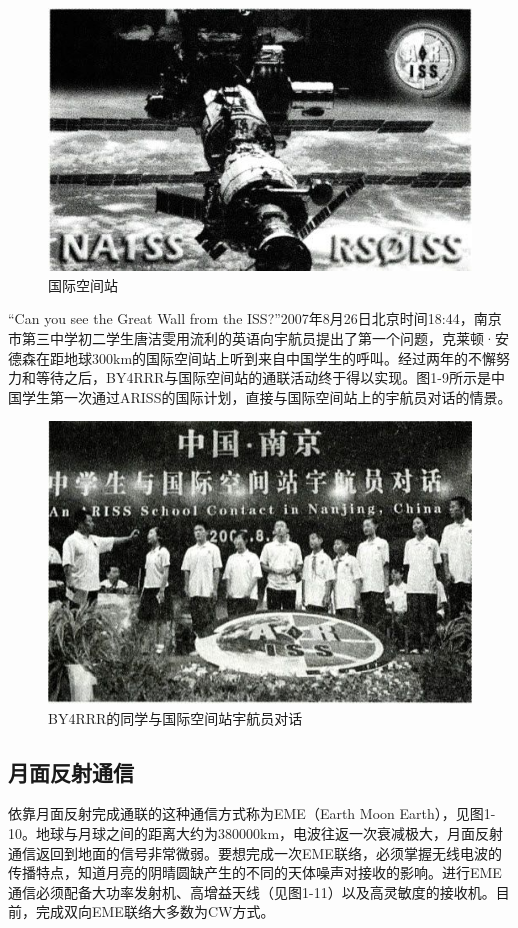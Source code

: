 \documentclass[12pt,UTF8]{ctexbook}
\begin{document}
\begin{figure}[htbp]
	\centering
	\includegraphics[width=0.7\linewidth]{8}
	\caption{国际空间站}
	\label{fig:1}
\end{figure}

“Can you see the Great Wall from the ISS?”2007年8月26日北京时间18:44，南京市第三中学初二学生唐洁雯用流利的英语向宇航员提出了第一个问题，克莱顿·安德森在距地球300km的国际空间站上听到来自中国学生的呼叫。经过两年的不懈努力和等待之后，BY4RRR与国际空间站的通联活动终于得以实现。图1-9所示是中国学生第一次通过ARISS的国际计划，直接与国际空间站上的宇航员对话的情景。

\begin{figure}[htbp]
	\centering
	\includegraphics[width=0.7\linewidth]{9}
	\caption{BY4RRR的同学与国际空间站宇航员对话}
	\label{fig:1}
\end{figure}

\subsection{月面反射通信}

依靠月面反射完成通联的这种通信方式称为EME（Earth Moon Earth），见图1-10。地球与月球之间的距离大约为380000km，电波往返一次衰减极大，月面反射通信返回到地面的信号非常微弱。要想完成一次EME联络，必须掌握无线电波的传播特点，知道月亮的阴晴圆缺产生的不同的天体噪声对接收的影响。进行EME通信必须配备大功率发射机、高增益天线（见图1-11）以及高灵敏度的接收机。目前，完成双向EME联络大多数为CW方式。
\end{document}
